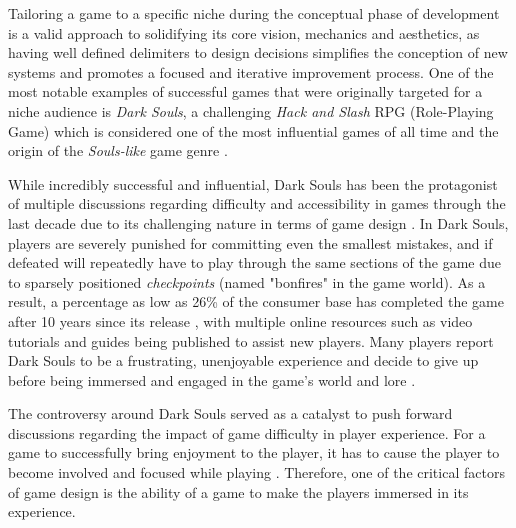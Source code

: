 Tailoring a game to a specific niche during the conceptual phase of development is a valid approach to solidifying its core vision, mechanics and aesthetics, as having well defined delimiters to design decisions simplifies the conception of new systems and promotes a focused and iterative improvement process. One of the most notable examples of successful games that were originally targeted for a niche audience is \emph{Dark Souls}, a challenging \emph{Hack and Slash} RPG (Role-Playing Game) which is considered one of the most influential games of all time and  the origin of the \emph{Souls-like} game genre \cite{BOOK_DarkSoulsBeyondTheGrave}.

While incredibly successful and influential, Dark Souls has been the protagonist of multiple discussions regarding difficulty and accessibility in games through the last decade due to its challenging nature in terms of game design \cite{ONLINE_GettingWrongDarkSouls}. In Dark Souls, players are severely punished for committing even the smallest mistakes, and if defeated will repeatedly have to play through the same sections of the game due to sparsely positioned \emph{checkpoints} (named "bonfires" in the game world). As a result, a percentage as low as 26\% of the consumer base has completed the game after 10 years since its release \cite{ONLINE_ApproachabilityFixDarkSouls}, with multiple online resources such as video tutorials and guides being published to assist new players. Many players report Dark Souls to be a frustrating, unenjoyable experience and decide to give up before being immersed and engaged in the game's world and lore \cite{ONLINE_ToughLoveDarkSoulsDifficulty}.

The controversy around Dark Souls served as a catalyst to push forward discussions regarding the impact of game difficulty in player experience. For a game to successfully bring enjoyment to the player, it has to cause the player to become involved and focused while playing \cite{ARTICLE_FlowInGames}. Therefore, one of the critical factors of game design is the ability of a game to make the players immersed in its experience. 

